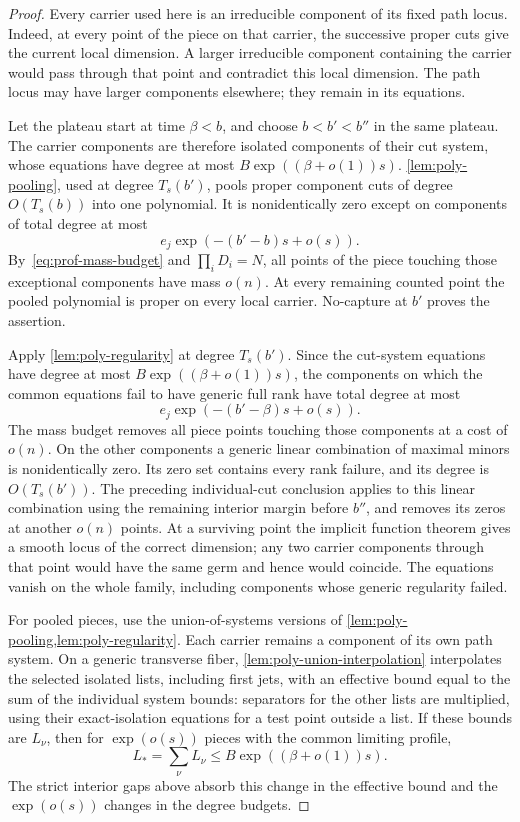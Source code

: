 \begin{proof}
Every carrier used here is an irreducible component of its fixed path locus.  Indeed, at every point of the piece on that carrier, the successive proper cuts give the current local dimension.  A larger irreducible component containing the carrier would pass through that point and contradict this local dimension.  The path locus may have larger components elsewhere; they remain in its equations.

Let the plateau start at time $\beta<b$, and choose $b<b'<b''$ in the same plateau.  The carrier components are therefore isolated components of their cut system, whose equations have degree at most $B\exp((\beta+o(1))s)$.  \cref{lem:poly-pooling}, used at degree $T_s(b')$, pools proper component cuts of degree $O(T_s(b))$ into one polynomial.  It is nonidentically zero except on components of total degree at most
\[
 e_j\exp(-(b'-b)s+o(s)).
\]
By~\eqref{eq:prof-mass-budget} and $\prod_iD_i=N$, all points of the piece touching those exceptional components have mass $o(n)$. At every remaining counted point the pooled polynomial is proper on every local carrier.  No-capture at $b'$ proves the assertion.

Apply \cref{lem:poly-regularity} at degree $T_s(b')$.  Since the cut-system equations have degree at most $B\exp((\beta+o(1))s)$, the components on which the common equations fail to have generic full rank have total degree at most
\[
 e_j\exp(-(b'-\beta)s+o(s)).
\]
The mass budget removes all piece points touching those components at a cost of $o(n)$.  On the other components a generic linear combination of maximal minors is nonidentically zero.  Its zero set contains every rank failure, and its degree is $O(T_s(b'))$. The preceding individual-cut conclusion applies to this linear combination using the remaining interior margin before $b''$, and removes its zeros at another $o(n)$ points.  At a surviving point the implicit function theorem gives a smooth locus of the correct dimension; any two carrier components through that point would have the same germ and hence would coincide.  The equations vanish on the whole family, including components whose generic regularity failed.

For pooled pieces, use the union-of-systems versions of \cref{lem:poly-pooling,lem:poly-regularity}.  Each carrier remains a component of its own path system.  On a generic transverse fiber, \cref{lem:poly-union-interpolation} interpolates the selected isolated lists, including first jets, with an effective bound equal to the sum of the individual system bounds: separators for the other lists are multiplied, using their exact-isolation equations for a test point outside a list.  If these bounds are $L_\nu$, then for $\exp(o(s))$ pieces with the common limiting profile,
\[
 L_*=\sum_\nu L_\nu\le B\exp((\beta+o(1))s).
\]
The strict interior gaps above absorb this change in the effective bound and the $\exp(o(s))$ changes in the degree budgets.


\end{proof}
